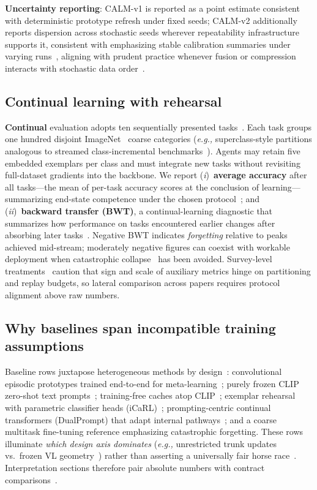 \documentclass[12pt,a4paper]{report}
\begin{document}
\textbf{Uncertainty reporting}: CALM-v1 is reported as a point estimate consistent with deterministic prototype refresh under fixed seeds; CALM-v2 additionally reports dispersion across stochastic seeds wherever repeatability infrastructure supports it, consistent with emphasizing stable calibration summaries under varying runs~\cite{r5}, aligning with prudent practice whenever fusion or compression interacts with stochastic data order~\cite{r21}.

\subsection*{Continual learning with rehearsal}
\textbf{Continual} evaluation adopts ten sequentially presented tasks~\cite{r7,r19}. Each task groups one hundred disjoint ImageNet~\cite{r2} coarse categories (\emph{e.g.,} superclass-style partitions analogous to streamed class-incremental benchmarks~\cite{r7}). Agents may retain five embedded exemplars per class and must integrate new tasks without revisiting full-dataset gradients into the backbone. We report (\emph{i})~\textbf{average accuracy} after all tasks---the mean of per-task accuracy scores at the conclusion of learning---summarizing end-state competence under the chosen protocol~\cite{r19}; and (\emph{ii})~\textbf{backward transfer (BWT)}, a continual-learning diagnostic that summarizes how performance on tasks encountered earlier changes after absorbing later tasks~\cite{r19}. Negative BWT indicates \emph{forgetting} relative to peaks achieved mid-stream; moderately negative figures can coexist with workable deployment when catastrophic collapse~\cite{r6} has been avoided. Survey-level treatments~\cite{r19} caution that sign and scale of auxiliary metrics hinge on partitioning and replay budgets, so lateral comparison across papers requires protocol alignment above raw numbers.

\subsection*{Why baselines span incompatible training assumptions}
Baseline rows juxtapose heterogeneous methods by design~\cite{r16,r19}: convolutional episodic prototypes trained end-to-end for meta-learning~\cite{r3}; purely frozen CLIP zero-shot text prompts~\cite{r1}; training-free caches atop CLIP~\cite{r4}; exemplar rehearsal with parametric classifier heads (iCaRL)~\cite{r7}; prompting-centric continual transformers (DualPrompt) that adapt internal pathways~\cite{r8,r17}; and a coarse multitask fine-tuning reference emphasizing catastrophic forgetting. These rows illuminate \emph{which design axis dominates} (\emph{e.g.,} unrestricted trunk updates~\cite{r8} vs.\ frozen VL geometry~\cite{r1,r9}) rather than asserting a universally fair horse race~\cite{r19}. Interpretation sections therefore pair absolute numbers with contract comparisons~\cite{r7,r24}.
\end{document}
